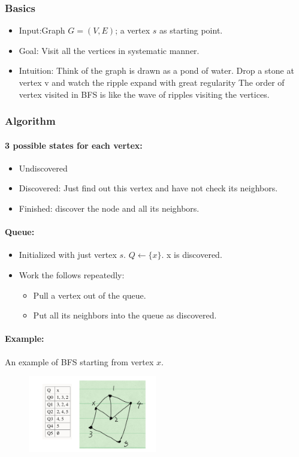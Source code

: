 \documentclass[en,hazy,blue,normal,12pt]{elegantnote}
\begin{document}
\subsubsection{Basics}
\begin{itemize}
    \item Input:Graph $G = (V, E)$; a vertex $s$ as starting point.
    \item Goal: Visit all the vertices in systematic manner.
    \item Intuition: Think of the graph is drawn as a pond of water. Drop a 
stone at vertex v and watch the ripple expand with great regularity The 
order of vertex visited in BFS is like the wave of ripples visiting the 
vertices.
\end{itemize}

\subsubsection{Algorithm}

\paragraph{3 possible states for each vertex:}
\begin{itemize}
 \item Undiscovered
 \item Discovered: Just find out this vertex and have not check its neighbors.
 \item Finished: discover the node and all its neighbors.
\end{itemize}
\paragraph{Queue:}
\begin{itemize}
 \item Initialized with just vertex $s$. $Q \leftarrow \{x\}$. x is discovered.
 \item Work the follows repeatedly:
 \begin{itemize}
  \item Pull a vertex out of the queue.
  \item Put all its neighbors into the queue as discovered.
 \end{itemize}
\end{itemize}

\paragraph{Example:}
An example of BFS starting from vertex $x$.
\begin{figure}[H]
\centering
\includegraphics[width=0.5\textwidth]{queue.png}
\end{figure}
\end{document}
